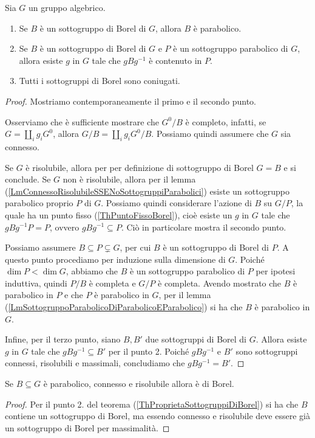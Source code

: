 \begin{theorem}\label{ThProprietaSottogruppiDiBorel}
Sia $G$ un gruppo algebrico. 
\begin{enumerate}
    \item Se $B$ è un sottogruppo di Borel di $G$, allora $B$ è parabolico.
    \item Se $B$ è un sottogruppo di Borel di $G$ e $P$ è un sottogruppo parabolico di $G$, allora esiste $g$ in $G$ tale che $gBg^{-1}$ è contenuto in $P$.
    \item Tutti i sottogruppi di Borel sono coniugati.
\end{enumerate}
\end{theorem}

\begin{proof}
Mostriamo contemporaneamente il primo e il secondo punto. 

Osserviamo che è sufficiente mostrare che $G^0/B$ è completo, infatti, se $G=\coprod_i g_i G^0$, allora $G/B=\coprod_i g_i G^0/B$. Possiamo quindi assumere che $G$ sia connesso. 

Se $G$ è risolubile, allora per per definizione di sottogruppo di Borel $G=B$ e si conclude. Se $G$ non è risolubile, allora per il lemma (\ref{LmConnessoRisolubileSSENoSottogruppiParabolici}) esiste un sottogruppo parabolico proprio $P$ di $G$. Possiamo quindi considerare l'azione di $B$ su $G/P$, la quale ha un punto fisso (\ref{ThPuntoFissoBorel}), cioè esiste un $g$ in $G$ tale che $gBg^{-1}P=P$, ovvero $gBg^{-1}\subseteq P$. Ciò in particolare mostra il secondo punto. 

Possiamo assumere $B\subseteq P \subsetneq G$, per cui $B$ è un sottogruppo di Borel di $P$. A questo punto procediamo per induzione sulla dimensione di $G$. Poiché $\dim P <\dim G$, abbiamo che $B$ è un sottogruppo parabolico di $P$ per ipotesi induttiva, quindi $P/B$ è completa e $G/P$ è completa. Avendo mostrato che $B$ \`e parabolico in $P$ e che $P$ \`e parabolico in $G$, per il lemma (\ref{LmSottogruppoParabolicoDiParabolicoEParabolico}) si ha che $B$ è parabolico in $G$.

Infine, per il terzo punto, siano $B,B'$ due sottogruppi di Borel di $G$. Allora esiste $g$ in $G$ tale che $gBg^{-1} \subseteq B'$ per il punto 2. Poiché $gBg^{-1}$ e $B'$ sono sottogruppi connessi, risolubili e massimali, concludiamo che $gBg^{-1} = B'$.
\end{proof}

\begin{corollary}\label{CorPrabolicoRisolubileConnessoEBorel}
Se $B\subseteq G$ \`e parabolico, connesso e risolubile allora \`e di Borel.
\end{corollary}
\begin{proof}
Per il punto 2. del teorema (\ref{ThProprietaSottogruppiDiBorel}) si ha che $B$ contiene un sottogruppo di Borel, ma essendo connesso e risolubile deve essere gi\`a un sottogruppo di Borel per massimalit\`a.
\end{proof}

